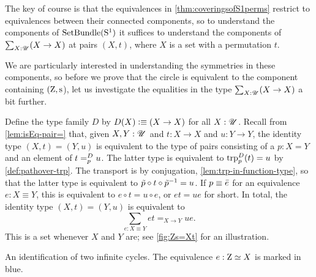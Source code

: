 The key of course is that the equivalences in \cref{thm:coveringsofS1perms}
restrict to equivalences between their connected components,
so to understand the components of $\mathrm{SetBundle}({\mathrm{S}^1})$
it suffices to understand the components of $\sum_{X:{\mathscr{U}}}(X \to X)$ at pairs $(X,t)$,
where $X$ is a set with a permutation $t$.

We are particularly interested in understanding the symmetries in these components,
so before we prove that the circle is equivalent to the component containing $(\zet,\zs$),
let us investigate the equalities in the type $\sum_{X:{\mathscr{U}}}(X \to X)$ a bit further.

Define the type family $D$ by $D(X) \defeq (X\to X)$ for all $X:{\mathscr{U}}$.
Recall from \cref{lem:isEq-pair=} that, given $X,Y:{\mathscr{U}}$ and $t:X\to X$ and $u:Y\to Y$,
the identity type $(X,t)=(Y,u)$
is equivalent to the type of pairs consisting of a $p:X=Y$ and
an element of $\pathover{t}{D}{p}{u}$. The latter type is
equivalent to $\trp[D]{p}(t) = u$ by \cref{def:pathover-trp}.
The transport is by conjugation,
\cref{lem:trp-in-function-type}, so that the latter
type is equivalent to $\tilde {p}\circ t\circ \tilde {p}^{-1} = u$.
If $p\jdeq\etop e$ for an equivalence $e:X\equiv Y$,
this is equivalent to $e\circ t = u\circ e$, or $e t = u e$ for short.
In total, the identity type $(X,t)=(Y,u)$ is equivalent to
\[
  \sum_{e: X\equiv Y} et =_{X\to Y} ue.
\]
This is a set whenever $X$ and $Y$ are; see \cref{fig:Zs=Xt} for an illustration.
\begin{marginfigure}
  \caption{An identification of two infinite cycles.
    The equivalence $e : \mathrm{Z} \simeq X$ is marked in blue.}\label{fig:Zs=Xt}
\end{marginfigure}
